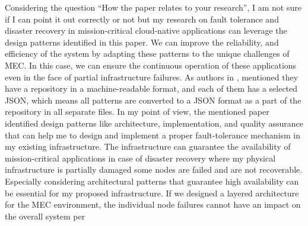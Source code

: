 \documentclass{article}
\begin{document}
Considering the question ``How the paper relates to your research'', I am not sure if I can point it out correctly or not but my research on fault tolerance and disaster recovery in mission-critical cloud-native applications can leverage the design patterns identified in this paper. We can improve the reliability, and efficiency of the system by adapting these patterns to the unique challenges of MEC. In this case, we can ensure the continuous operation of these applications even in the face of partial infrastructure failures. As authors in \cite{10164748}, mentioned they have a repository in a machine-readable format, and each of them has a selected JSON, which means all patterns are converted to a JSON format as a part of the repository in all separate files. In my point of view, the mentioned paper identified design patterns like architecture, implementation, and quality assurance that can help me to design and implement a proper fault-tolerance mechanism in my existing infrastructure. The infrastructure can guarantee the availability of mission-critical applications in case of disaster recovery where my physical infrastructure is partially damaged some nodes are failed and are not recoverable. Especially considering architectural patterns that guarantee high availability can be essential for my proposed infrastructure. If we designed a layered architecture for the MEC environment, the individual node failures cannot have an impact on the overall system per
\end{document}

